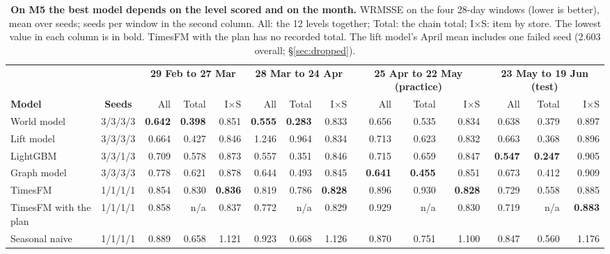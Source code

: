 \begin{table}[t]
\centering
\caption{\textbf{On M5 the best model depends on the level scored and on the month.} WRMSSE on the four 28-day
windows (lower is better), mean over seeds; seeds per window in the second column. All: the 12 levels together;
Total: the chain total; I$\times$S: item by store. The lowest value in each column is in bold. TimesFM with the
plan has no recorded total. The lift model's April mean includes one failed seed (2.603 overall;
\S\ref{sec:dropped}).}
\label{tab:m5}
\footnotesize
\setlength{\tabcolsep}{3.6pt}
\begin{tabular}{lc*{12}{r}}
\toprule
 & & \multicolumn{3}{c}{\textbf{29 Feb to 27 Mar}} & \multicolumn{3}{c}{\textbf{28 Mar to 24 Apr}} & \multicolumn{3}{c}{\textbf{25 Apr to 22 May (practice)}} & \multicolumn{3}{c}{\textbf{23 May to 19 Jun (test)}} \\
\cmidrule(lr){3-5}\cmidrule(lr){6-8}\cmidrule(lr){9-11}\cmidrule(lr){12-14}
\textbf{Model} & \textbf{Seeds} & All & Total & I$\times$S & All & Total & I$\times$S & All & Total & I$\times$S & All & Total & I$\times$S \\
\midrule
World model & 3/3/3/3 & \textbf{0.642} & \textbf{0.398} & 0.851 & \textbf{0.555} & \textbf{0.283} & 0.833 & 0.656 & 0.535 & 0.834 & 0.638 & 0.379 & 0.897 \\
Lift model & 3/3/3/3 & 0.664 & 0.427 & 0.846 & 1.246 & 0.964 & 0.834 & 0.713 & 0.623 & 0.832 & 0.663 & 0.368 & 0.896 \\
LightGBM & 3/3/1/3 & 0.709 & 0.578 & 0.873 & 0.557 & 0.351 & 0.846 & 0.715 & 0.659 & 0.847 & \textbf{0.547} & \textbf{0.247} & 0.905 \\
Graph model & 3/3/3/3 & 0.778 & 0.621 & 0.878 & 0.644 & 0.493 & 0.845 & \textbf{0.641} & \textbf{0.455} & 0.851 & 0.673 & 0.412 & 0.909 \\
TimesFM & 1/1/1/1 & 0.854 & 0.830 & \textbf{0.836} & 0.819 & 0.786 & \textbf{0.828} & 0.896 & 0.930 & \textbf{0.828} & 0.729 & 0.558 & 0.885 \\
TimesFM with the plan & 1/1/1/1 & 0.858 & n/a & 0.837 & 0.772 & n/a & 0.829 & 0.929 & n/a & 0.830 & 0.719 & n/a & \textbf{0.883} \\
Seasonal naive & 1/1/1/1 & 0.889 & 0.658 & 1.121 & 0.923 & 0.668 & 1.126 & 0.870 & 0.751 & 1.100 & 0.847 & 0.560 & 1.176 \\
\bottomrule
\end{tabular}
\end{table}
